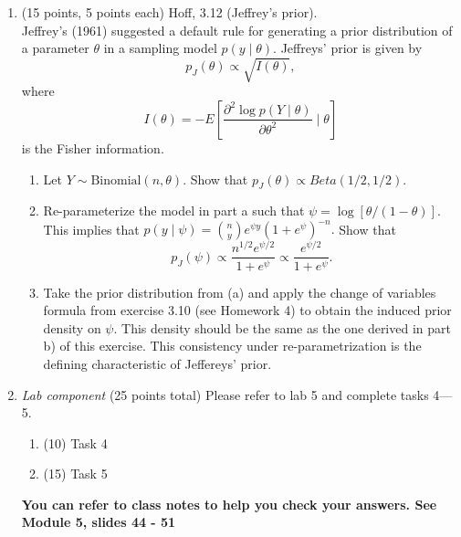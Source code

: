 \documentclass{article}
\begin{document}
\begin{enumerate}
\item (15 points, 5 points each) Hoff, 3.12 (Jeffrey's prior). \\
Jeffrey's (1961) suggested a default rule for generating a prior distribution of a parameter $\theta$ in a sampling model $p(y \mid \theta).$ Jeffreys' prior is given by 
$$p_J(\theta) \propto \sqrt{I(\theta)},$$
where $$I(\theta) = - E\left[
\frac{\partial^2 \log p(Y \mid \theta)}{\partial \theta^2}
\mid \theta \right]
$$ is the Fisher information. 
\begin{enumerate}
\item Let $Y \sim \text{Binomial}(n,\theta).$ Show that $p_J(\theta) \propto Beta(1/2,1/2).$
\item Re-parameterize the model in part a such that $\psi= \log[\theta/(1-\theta)].$ This implies that $p(y \mid \psi) = 
{n \choose y} e^{\psi y} (1 + e^{\psi})^{-n}.$ Show that 
$$p_J(\psi) \propto \frac{n^{1/2}e^{\psi/2}}{1+ e^{\psi}} \propto \frac{e^{\psi/2}}{1+ e^{\psi}}.$$
\item Take the prior distribution from (a) and apply the change of variables formula from exercise 3.10 (see Homework 4) to obtain the induced prior density on $\psi.$ This density should be the same as the one derived in part b) of this exercise. This consistency under re-parametrization is the defining characteristic of Jeffereys' prior. 
\end{enumerate}


\item {\em Lab component} 
  (25 points total) Please refer to lab 5 and complete tasks 4---5. 
  \begin{enumerate}
  \item (10) Task 4
  \item (15) Task 5
  \end{enumerate}
\textbf{You can refer to class notes to help you check your answers. See Module 5, slides 44 - 51}  
  
\end{enumerate}
\end{document}
